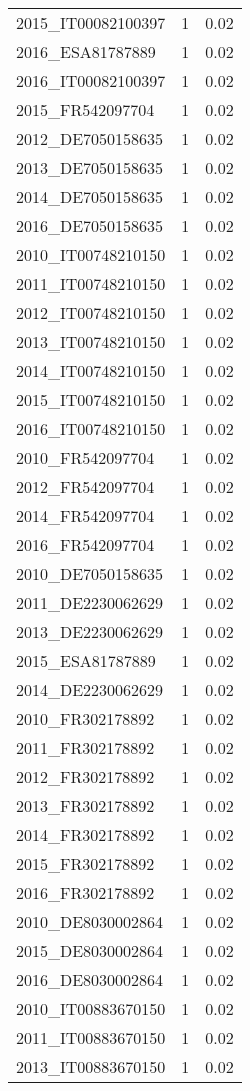 \begin{table*}[htbp]
\begin{tabular}{lrr}
2015_IT00082100397 & 1 & 0.02 \\
2016_ESA81787889 & 1 & 0.02 \\
2016_IT00082100397 & 1 & 0.02 \\
2015_FR542097704 & 1 & 0.02 \\
2012_DE7050158635 & 1 & 0.02 \\
2013_DE7050158635 & 1 & 0.02 \\
2014_DE7050158635 & 1 & 0.02 \\
2016_DE7050158635 & 1 & 0.02 \\
2010_IT00748210150 & 1 & 0.02 \\
2011_IT00748210150 & 1 & 0.02 \\
2012_IT00748210150 & 1 & 0.02 \\
2013_IT00748210150 & 1 & 0.02 \\
2014_IT00748210150 & 1 & 0.02 \\
2015_IT00748210150 & 1 & 0.02 \\
2016_IT00748210150 & 1 & 0.02 \\
2010_FR542097704 & 1 & 0.02 \\
2012_FR542097704 & 1 & 0.02 \\
2014_FR542097704 & 1 & 0.02 \\
2016_FR542097704 & 1 & 0.02 \\
2010_DE7050158635 & 1 & 0.02 \\
2011_DE2230062629 & 1 & 0.02 \\
2013_DE2230062629 & 1 & 0.02 \\
2015_ESA81787889 & 1 & 0.02 \\
2014_DE2230062629 & 1 & 0.02 \\
2010_FR302178892 & 1 & 0.02 \\
2011_FR302178892 & 1 & 0.02 \\
2012_FR302178892 & 1 & 0.02 \\
2013_FR302178892 & 1 & 0.02 \\
2014_FR302178892 & 1 & 0.02 \\
2015_FR302178892 & 1 & 0.02 \\
2016_FR302178892 & 1 & 0.02 \\
2010_DE8030002864 & 1 & 0.02 \\
2015_DE8030002864 & 1 & 0.02 \\
2016_DE8030002864 & 1 & 0.02 \\
2010_IT00883670150 & 1 & 0.02 \\
2011_IT00883670150 & 1 & 0.02 \\
2013_IT00883670150 & 1 & 0.02 \\

\end{tabular}
\end{table*}

